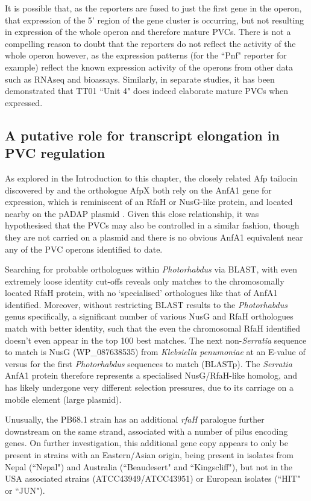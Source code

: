 It is possible that, as the reporters are fused to just the first gene in the operon, that expression of the 5' region of the gene cluster is occurring, but not resulting in expression of the whole operon and therefore mature PVCs. There is not a compelling reason to doubt that the reporters do not reflect the activity of the whole operon however, as the expression patterns (for the \Pasy{} ``Pnf" reporter for example) reflect the known expression activity of the operons from other data such as RNAseq and bioassays. Similarly, in separate studies, it has been demonstrated that \Plum{} TT01 ``Unit 4" does indeed elaborate mature PVCs when expressed.



\subsection{A putative role for transcript elongation in PVC regulation}
As explored in the Introduction to this chapter, the closely related Afp tailocin discovered by \cite{Hurst2004} and the orthologue AfpX \citep{Hurst2018} both rely on the AnfA1 gene for expression, which is reminiscent of an RfaH or NusG-like protein, and located nearby on the pADAP plasmid \citep{Hurst2007a}. Given this close relationship, it was hypothesised that the PVCs may also be controlled in a similar fashion, though they are not carried on a plasmid and there is no obvious AnfA1 equivalent near any of the PVC operons identified to date.

Searching for probable orthologues within \emph{Photorhabdus} via BLAST, with even extremely loose identity cut-offs reveals only matches to the chromosomally located RfaH protein, with no `specialised' orthologues like that of AnfA1 identified. Moreover, without restricting BLAST results to the \emph{Photorhabdus} genus specifically, a significant number of various NusG and RfaH orthologues match with better identity, such that the even the chromosomal RfaH identified doesn't even appear in the top 100 best matches. The next non-\emph{Serratia} sequence to match is NusG (WP\_087638535) from \emph{Klebsiella penumoniae} at an E-value of  versus  for the first \emph{Photorhabdus} sequences to match (BLASTp). The \emph{Serratia} AnfA1 protein therefore represents a specialised NusG/RfaH-like homolog, and has likely undergone very different selection pressures, due to its carriage on a mobile element (large plasmid).

Unusually, the PB68.1 strain has an additional \emph{rfaH} paralogue further downstream on the same strand, associated with a number of pilus encoding genes. On further investigation, this additional gene copy appears to only be present in \Pasy{} strains with an Eastern/Asian origin, being present in isolates from Nepal (``Nepal") and Australia (``Beaudesert" and ``Kingscliff"), but not in the USA associated strains (ATCC43949/ATCC43951) or European isolates (``HIT" or ``JUN").

